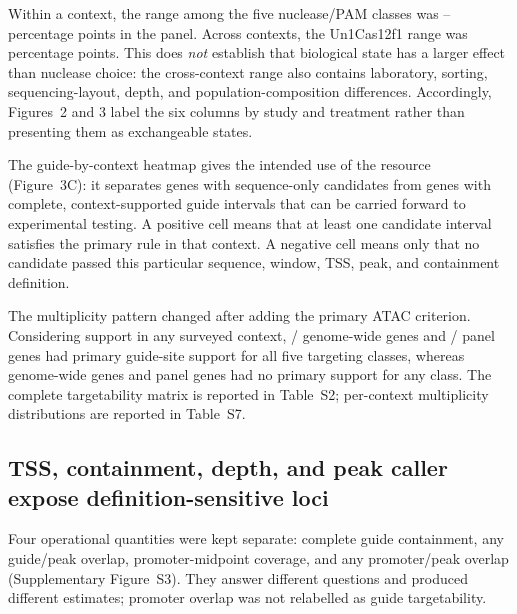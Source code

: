\documentclass[11pt]{article}
\begin{document}
Within a context, the range among the five nuclease/PAM classes was \PanelClassSpreadMinPP--\PanelClassSpreadMaxPP{} percentage points in the panel. Across contexts, the Un1Cas12f1 range was \UnPanelAcrossContextRangePP{} percentage points. This does \emph{not} establish that biological state has a larger effect than nuclease choice: the cross-context range also contains laboratory, sorting, sequencing-layout, depth, and population-composition differences. Accordingly, Figures~2 and 3 label the six columns by study and treatment rather than presenting them as exchangeable states.

The guide-by-context heatmap gives the intended use of the resource (Figure~3C): it separates genes with sequence-only candidates from genes with complete, context-supported guide intervals that can be carried forward to experimental testing. A positive cell means that at least one candidate interval satisfies the primary rule in that context. A negative cell means only that no candidate passed this particular sequence, window, TSS, peak, and containment definition.

The multiplicity pattern changed after adding the primary ATAC criterion. Considering support in any surveyed context, \MultiGenomeAnyAllFiveN/\NGeneFormatted{} genome-wide genes and \MultiPanelAnyAllFiveN/\NPanel{} panel genes had primary guide-site support for all five targeting classes, whereas \MultiGenomeAnyNoneN{} genome-wide genes and \MultiPanelAnyNoneN{} panel genes had no primary support for any class. The complete targetability matrix is reported in Table~S2; per-context multiplicity distributions are reported in Table~S7.

\subsection{TSS, containment, depth, and peak caller expose definition-sensitive loci}

Four operational quantities were kept separate: complete guide containment, any guide/peak overlap, promoter-midpoint coverage, and any promoter/peak overlap (Supplementary Figure~S3). They answer different questions and produced different estimates; promoter overlap was not relabelled as guide targetability.
\end{document}

